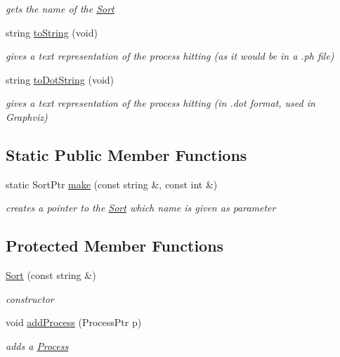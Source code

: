\begin{DoxyCompactItemize}
\begin{DoxyCompactList}\small\item\em gets the name of the \hyperlink{classSort}{Sort} \end{DoxyCompactList}\item 
string \hyperlink{classSort_ae160613fb2d5c7fd9818a5c7d4be992a}{to\+String} (void)
\begin{DoxyCompactList}\small\item\em gives a text representation of the process hitting (as it would be in a .ph file) \end{DoxyCompactList}\item 
string \hyperlink{classSort_a9bb67cd444d217dd477c896a31d869a0}{to\+Dot\+String} (void)
\begin{DoxyCompactList}\small\item\em gives a text representation of the process hitting (in .dot format, used in Graphviz) \end{DoxyCompactList}\end{DoxyCompactItemize}
\subsection*{Static Public Member Functions}
\begin{DoxyCompactItemize}
\item 
static Sort\+Ptr \hyperlink{classSort_a61845c120a79f7af7a756ecf3efce308}{make} (const string \&, const int \&)
\begin{DoxyCompactList}\small\item\em creates a pointer to the \hyperlink{classSort}{Sort} which name is given as parameter \end{DoxyCompactList}\end{DoxyCompactItemize}
\subsection*{Protected Member Functions}
\begin{DoxyCompactItemize}
\item 
\hypertarget{classSort_ab9d3cb2bb873e058d0129e793c947d45}{\hyperlink{classSort_ab9d3cb2bb873e058d0129e793c947d45}{Sort} (const string \&)}\label{classSort_ab9d3cb2bb873e058d0129e793c947d45}

\begin{DoxyCompactList}\small\item\em constructor \end{DoxyCompactList}\item 
void \hyperlink{classSort_a63bd04693623b2a269e76b9d5269e880}{add\+Process} (Process\+Ptr p)
\begin{DoxyCompactList}\small\item\em adds a \hyperlink{classProcess}{Process} \end{DoxyCompactList}\end{DoxyCompactItemize}
